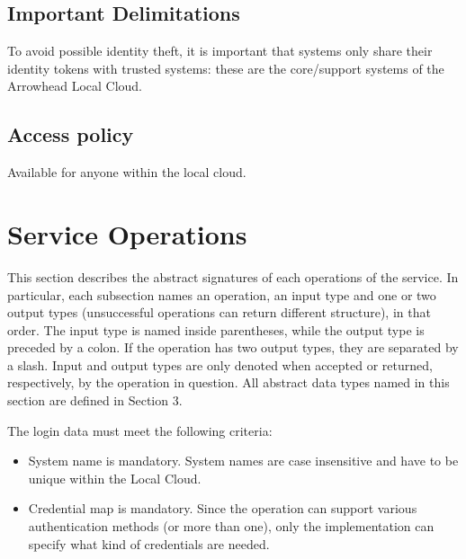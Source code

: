 \documentclass[a4paper]{arrowhead}
\begin{document}
\subsection{Important Delimitations}
\label{sec:delimitations}

To avoid possible identity theft, it is important that systems only share their identity tokens with trusted systems: these are the core/support systems of the Arrowhead Local Cloud. 

\subsection{Access policy}
\label{sec:accesspolicy}

Available for anyone within the local cloud.

\newpage

\section{Service Operations}
\label{sec:functions}

This section describes the abstract signatures of each operations of the service. In particular, each subsection names an operation, an input type and one or two output types (unsuccessful operations can return different structure), in that order.
The input type is named inside parentheses, while the output type is preceded by a colon. If the operation has two output types, they are separated by a slash.
Input and output types are only denoted when accepted or returned, respectively, by the operation in question. All abstract data types named in this section are defined in Section 3.

{}

The login data must meet the following criteria:

\begin{itemize}
    \item System name is mandatory. System names are case insensitive and have to be unique within the Local Cloud.
    \item Credential map is mandatory. Since the operation can support various authentication methods (or more than one), only the implementation can specify what kind of credentials are needed.
\end{itemize}

\end{document}
